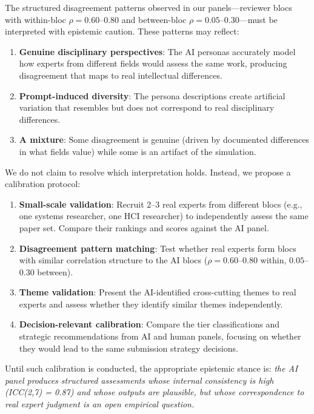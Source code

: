 The structured disagreement patterns observed in our panels---reviewer blocs with within-bloc $\rho = 0.60$--$0.80$ and between-bloc $\rho = 0.05$--$0.30$---must be interpreted with epistemic caution. These patterns may reflect:
\begin{enumerate}
    \item \textbf{Genuine disciplinary perspectives}: The AI personas accurately model how experts from different fields would assess the same work, producing disagreement that maps to real intellectual differences.
    \item \textbf{Prompt-induced diversity}: The persona descriptions create artificial variation that resembles but does not correspond to real disciplinary differences.
    \item \textbf{A mixture}: Some disagreement is genuine (driven by documented differences in what fields value) while some is an artifact of the simulation.
\end{enumerate}

We do not claim to resolve which interpretation holds. Instead, we propose a calibration protocol:
\begin{enumerate}
    \item \textbf{Small-scale validation}: Recruit 2--3 real experts from different blocs (e.g., one systems researcher, one HCI researcher) to independently assess the same paper set. Compare their rankings and scores against the AI panel.
    \item \textbf{Disagreement pattern matching}: Test whether real experts form blocs with similar correlation structure to the AI blocs ($\rho = 0.60$--$0.80$ within, $0.05$--$0.30$ between).
    \item \textbf{Theme validation}: Present the AI-identified cross-cutting themes to real experts and assess whether they identify similar themes independently.
    \item \textbf{Decision-relevant calibration}: Compare the tier classifications and strategic recommendations from AI and human panels, focusing on whether they would lead to the same submission strategy decisions.
\end{enumerate}

Until such calibration is conducted, the appropriate epistemic stance is: \textit{the AI panel produces structured assessments whose internal consistency is high (ICC(2,7) = 0.87) and whose outputs are plausible, but whose correspondence to real expert judgment is an open empirical question.}

